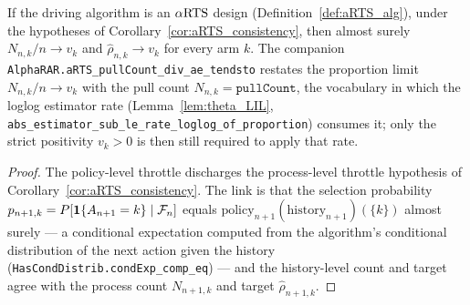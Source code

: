 \begin{corollary}\label{cor:aRTS_alg_consistency}
\leanok
{}
If the driving algorithm is an $\alpha\text{RTS}$ design (Definition~\ref{def:aRTS_alg}), under the hypotheses
of Corollary~\ref{cor:aRTS_consistency}, then almost surely $N_{n,k}/n\to v_k$ and
$\hat\rho_{n,k}\to v_k$ for every arm $k$. The companion
\texttt{AlphaRAR.aRTS\_pullCount\_div\_ae\_tendsto} restates the proportion limit
$N_{n,k}/n\to v_k$ with the pull count $N_{n,k}=\texttt{pullCount}$, the vocabulary in which the
loglog estimator rate (Lemma~\ref{lem:theta_LIL},
\texttt{abs\_estimator\_sub\_le\_rate\_loglog\_of\_proportion}) consumes it; only the strict
positivity $v_k>0$ is then still required to apply that rate.
\end{corollary}

\begin{proof}\leanok
{}
The policy-level throttle discharges the process-level throttle hypothesis of
Corollary~\ref{cor:aRTS_consistency}. The link is that the selection probability
$p_{n+1,k}=P[\mathbf 1\{A_{n+1}=k\}\mid\mathcal{F}_n]$ equals
$\mathrm{policy}_{n+1}(\text{history}_{n+1})(\{k\})$ almost surely — a conditional expectation computed from the algorithm's conditional distribution of
the next action given the history (\texttt{HasCondDistrib.condExp\_comp\_eq}) — and the history-level
count and target agree with the process count $N_{n+1,k}$ and target $\hat\rho_{n+1,k}$.
\end{proof}
